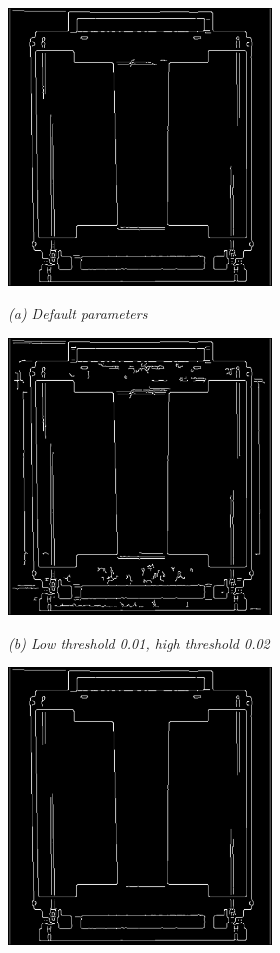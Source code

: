\begin{figure}[htb]
  \begin{minipage}[t]{2.75in}
    \centering
    \centerline{\mbox{\includegraphics[width=2.75in]{data_extraction/images/canny/default/20121017_141.eps}}}
    \centerline{\emph{(a) Default parameters}}
  \end{minipage}\medskip
  \begin{minipage}[t]{2.75in}
    \centering
    \centerline{\mbox{\includegraphics[width=2.75in]{data_extraction/images/canny/0.01_0.02/20121017_141.eps}}}
    \centerline{\emph{(b) Low threshold 0.01, high threshold  0.02}}
  \end{minipage}
  \begin{minipage}[t]{2.75in}
    \centering
    \centerline{\mbox{\includegraphics[width=2.75in]{data_extraction/images/canny/0.02_0.04/20121017_141.eps}}}

\end{minipage}
\end{figure}
